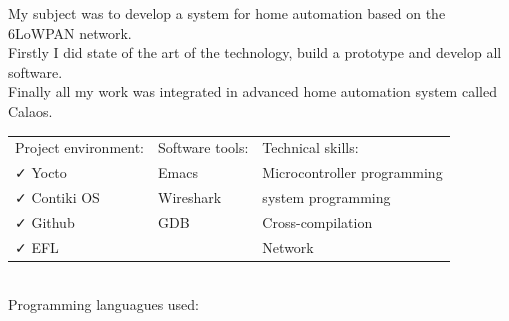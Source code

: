 \documentclass[letterpaper]{jm-cv} %
\begin{document}
\divider


\small {

  My subject was to develop a system for home automation based on the 6LoWPAN network.\\
  Firstly I did state of the art of the technology, build a prototype and develop all software.\\
  Finally all my work was integrated in advanced home automation system called Calaos.

  \begin{tabular}{ l l l }
    Project environment: & \hspace{1cm}Software tools: & \hspace{1cm}Technical skills:\\
    {\color{mainblue}\faCheck} Yocto &
    \hspace{1cm}{\color{maingreen}\faCheck} Emacs &
    \hspace{1cm}{\color{maingray}\faCheck} Microcontroller programming\\

    {\color{mainblue}\faCheck} Contiki OS &
    \hspace{1cm}{\color{maingreen}\faCheck} Wireshark &
    \hspace{1cm}{\color{maingray}\faCheck} system programming\\

    {\color{mainblue}\faCheck} Github &
    \hspace{1cm}{\color{maingreen}\faCheck} GDB &
    \hspace{1cm}{\color{maingray}\faCheck} Cross-compilation\\

    {\color{mainblue}\faCheck} EFL &
    &
    \hspace{1cm}{\color{maingray}\faCheck} Network\\

  \end{tabular}\\

  Programming languagues used:\\
}


\end{document}
